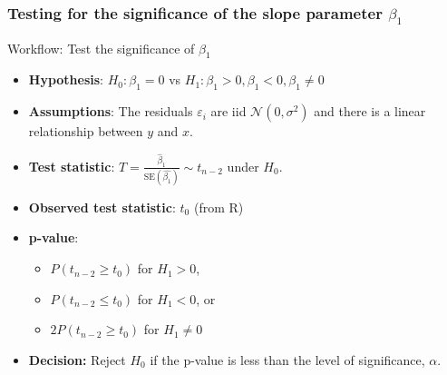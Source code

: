 \documentclass[a4paper]{article}\usepackage[]{graphicx}\usepackage[]{xcolor}
\begin{document}
\subsubsection{Testing for the significance of the slope parameter \( \beta_1 \)}
\begin{redbox}{Workflow: Test the significance of \( \beta_1 \)}
	\begin{itemize}
		\item \textbf{Hypothesis}: \( H_0: \beta_1=0 \) vs \( H_1: \beta_1 > 0, \beta_1 < 0, \beta_1 \neq 0 \)
		\item \textbf{Assumptions}: The residuals \( \varepsilon_i \) are iid \( \mathcal{N}(0,\sigma^2) \) and there is a linear relationship between \( y \) and \( x \).
		\item \textbf{Test statistic}: \( T = \frac{\hat{\beta}_1}{\text{SE}(\hat{\beta_1})} \sim t_{n-2} \) under \( H_0 \).
		\item \textbf{Observed test statistic}: \( t_0 \) (from R)
		\item \textbf{p-value}:
		\begin{itemize}
			\item \( P(t_{n-2} \geq t_0) \) for \( H_1 > 0 \), 
			\item \( P(t_{n-2} \leq t_0) \) for \( H_1 < 0 \), or 
			\item \( 2P(t_{n-2} \geq t_0) \) for \( H_1 \neq 0 \) 
		\end{itemize}
		\item \textbf{Decision:} Reject \( H_0 \) if the p-value is less than the level of significance, \( \alpha \).
	\end{itemize}
\end{redbox}
\end{document}
